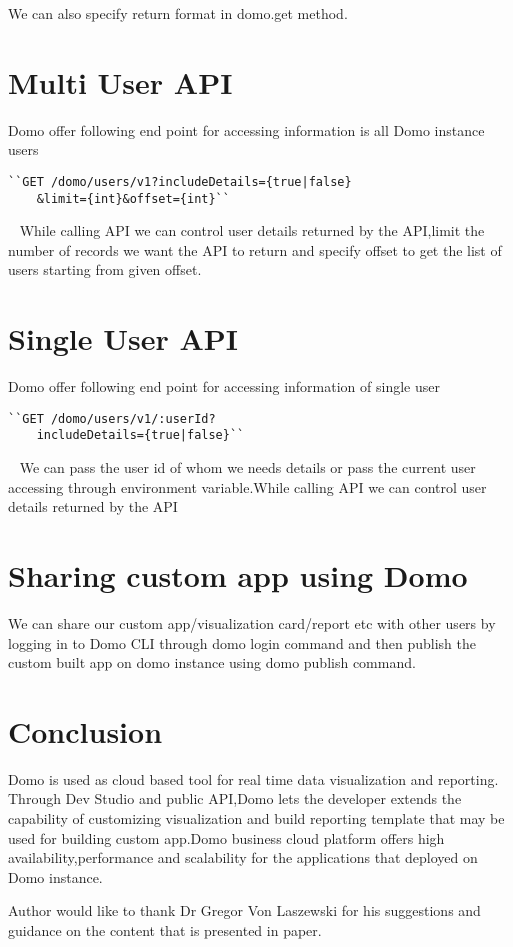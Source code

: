 We can also specify return format in domo.get method.


\section{Multi User API}
Domo offer following end point for accessing information is all
Domo instance users
\begin{verbatim}
``GET /domo/users/v1?includeDetails={true|false}
	&limit={int}&offset={int}``
\end{verbatim}
~\cite{hid-sp18-523-DataApi}
While calling API we can control user details returned by the API,limit
the number of records we want the API to return and specify offset to get
the list of users starting from given offset. 
~\cite{hid-sp18-523-User} 

\section{Single User API}
Domo offer following end point for accessing information of single user
\begin{verbatim}
``GET /domo/users/v1/:userId?
	includeDetails={true|false}``
\end{verbatim}
~\cite{hid-sp18-523-User}
We can pass the user id of whom we needs details or pass the current user
accessing through environment variable.While calling API we can control 
user details returned by the API~\cite{hid-sp18-523-User} 


\section{Sharing custom app using Domo}
We can share our custom app/visualization card/report etc with other users
by logging in to Domo CLI through domo login command and then publish the 
custom built app on domo instance using domo publish command. 


\section{Conclusion}
Domo is used as cloud based tool for real time data visualization and 
reporting. Through Dev Studio and public API,Domo lets the developer
extends the capability of customizing visualization and build reporting
template that may be used for building custom app.Domo business cloud
platform offers high availability,performance and scalability for the
applications that deployed on Domo instance.


\begin{acks}

Author would like to thank Dr Gregor Von Laszewski for his suggestions 
and guidance on the content that is presented in paper.
\end{acks}


 

